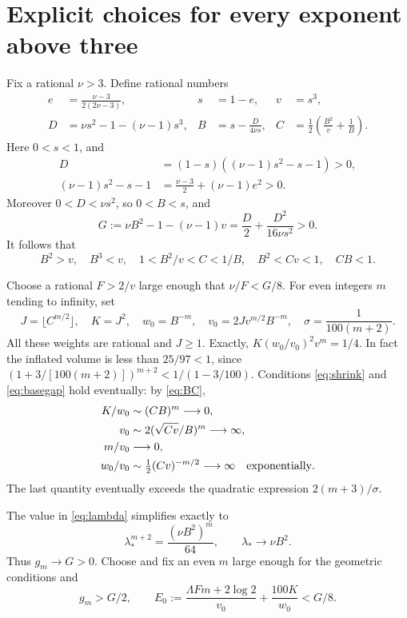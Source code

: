 \section{Explicit choices for every exponent above three}\label{sec:parameters}

Fix a rational \(\nu>3\). Define rational numbers
\begin{align*}
 e&=\frac{\nu-3}{2(2\nu-3)},& s&=1-e,& v&=s^3,\\
 D&=\nu s^2-1-(\nu-1)s^3,&
 B&=s-\frac{D}{4\nu s},&
 C&=\frac12\left(\frac{B^2}{v}+\frac1B\right).
\end{align*}
Here \(0<s<1\), and
\begin{align*}
 D&=(1-s)((\nu-1)s^2-s-1)>0,\\
 (\nu-1)s^2-s-1&=\frac{\nu-3}{2}+(\nu-1)e^2>0.
\end{align*}
Moreover \(0<D<\nu s^2\), so \(0<B<s\), and
\begin{equation}\label{eq:G}
 G:=\nu B^2-1-(\nu-1)v
                   =\frac D2+\frac{D^2}{16\nu s^2}>0.
\end{equation}
It follows that
\begin{equation}\label{eq:BC}
 B^2>v,\quad B^3<v,\quad 1<B^2/v<C<1/B,
 \quad B^2<Cv<1,\quad CB<1.
\end{equation}

Choose a rational \(F>2/v\) large enough that \(\nu/F<G/8\).
For even integers \(m\) tending to infinity, set
\begin{equation}\label{eq:scaling}
 J=\lfloor C^{m/2}\rfloor,\quad K=J^2,\quad
 w_0=B^{-m},\quad v_0=2Jv^{m/2}B^{-m},\quad
 \sigma=\frac1{100(m+2)}.
\end{equation}
All these weights are rational and \(J\geq1\). Exactly,
\(K(w_0/v_0)^2v^m=1/4\). In fact the inflated volume is less than
\(25/97<1\), since
\((1+3/[100(m+2)])^{m+2}<1/(1-3/100)\).
Conditions \eqref{eq:shrink} and \eqref{eq:basegap} hold eventually:
by \eqref{eq:BC},
\begin{align*}
 K/w_0&\sim(CB)^m\longrightarrow0,\\
 v_0&\sim2(\sqrt{Cv}/B)^m\longrightarrow\infty,\\
 m/v_0&\longrightarrow0,\\
 w_0/v_0&\sim\tfrac12(Cv)^{-m/2}\longrightarrow\infty
             \quad\hbox{exponentially}.
\end{align*}
The last quantity eventually exceeds the quadratic expression
\(2(m+3)/\sigma\).

The value in \eqref{eq:lambda} simplifies exactly to
\[
 \lambda_*^{m+2}=\frac{(\nu B^2)^m}{64},
 \qquad \lambda_*\longrightarrow\nu B^2.
\]
Thus \(g_m\to G>0\). Choose and fix an even \(m\) large enough
for the geometric conditions and
\begin{equation}\label{eq:mchoice}
 g_m>G/2,\qquad
 E_0:=\frac{\Lambda Fm+2\log2}{v_0}+\frac{100K}{w_0}<G/8.
\end{equation}


